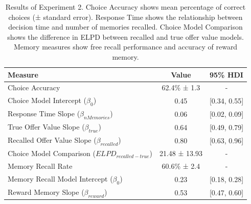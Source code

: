 \documentclass[10pt,letterpaper]{article}
\begin{document}
\clearpage
\begin{table}[t]
\centering
\begin{tabular}{lcc}
\hline
Measure & Value & 95\% HDI \\
\hline
Choice Accuracy & 62.4\% ± 1.3 & - \\
Choice Model Intercept ($\beta_0$) & 0.45 & [0.34, 0.55] \\
Response Time Slope ($\beta_{nMemories}$) & 0.06 & [0.02, 0.09] \\
True Offer Value Slope ($\beta_{true}$) & 0.64 & [0.49, 0.79] \\
Recalled Offer Value Slope ($\beta_{recalled}$) & 0.80 & [0.63, 0.96] \\
Choice Model Comparison ($ELPD_{recalled-true}$) & 21.48 ± 13.93 & - \\
Memory Recall Rate & 60.6\% ± 2.4 & - \\
Memory Recall Model Intercept ($\beta_0$) & 0.23 & [0.18, 0.28] \\
Reward Memory Slope ($\beta_{reward}$) & 0.53 & [0.47, 0.60] \\
\hline
\end{tabular}
\caption{Results of Experiment 2. Choice Accuracy shows mean percentage of correct choices (± standard error). Response Time shows the relationship between decision time and number of memories recalled. Choice Model Comparison shows the difference in ELPD between recalled and true offer value models. Memory measures show free recall performance and accuracy of reward memory.}
\label{tab:SuppExp2}
\end{table}
\end{document}

